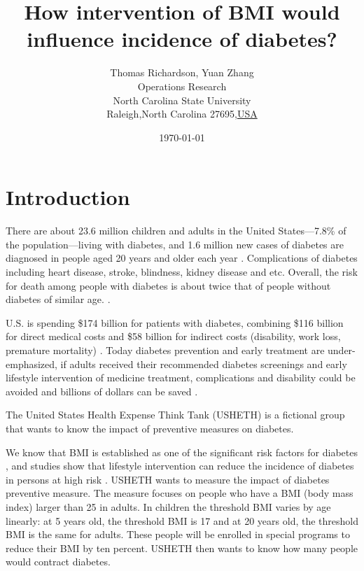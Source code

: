 \documentclass[letterpaper,12pt,onecolumn]{article}
\title{How intervention of BMI would influence incidence of diabetes? }
\author{Thomas Richardson, Yuan Zhang \\
        Operations Research\\
        North Carolina State University\\
        Raleigh,North Carolina 27695,\underline{USA}
}
\date{\today}
\begin{document}
\maketitle
\newpage


\section{Introduction}
There are about 23.6 million children and adults in the United States—7.8\% of the population—living with  diabetes, and 1.6 million new cases of diabetes are diagnosed in people aged 20 years and older each year \cite{Diabetes2007}. Complications of diabetes including heart disease, stroke, blindness, kidney disease and etc. Overall, the risk for death among people with diabetes is about twice that of people without diabetes of similar age. \cite{Diabetes2007}.

U.S. is spending \$174 billion for patients with diabetes, combining \$116 billion for direct medical costs and \$58 billion for indirect costs (disability, work loss, premature mortality) \cite{Diabetes2007}. Today diabetes prevention and early treatment are under-emphasized, if adults received their recommended diabetes screenings and early lifestyle intervention of  medicine treatment, complications and disability could be avoided and billions of dollars can be saved \cite{Chang2007}. 

The United States Health Expense Think Tank (USHETH) is a fictional group that wants to know the impact of preventive measures on diabetes.


We know that BMI is established as one of the  significant risk factors for diabetes \cite{Weinstein2004}, and studies show that lifestyle intervention can reduce the incidence of diabetes in persons at high risk \cite{Knowler2002}. USHETH wants to measure the impact of diabetes preventive measure. The measure focuses on people who have a BMI (body mass index) larger than 25 in adults.  In children the threshold BMI varies by age linearly: at 5 years old, the threshold BMI is 17 and at 20 years old, the threshold BMI is the same for adults.  These people will be enrolled in special programs to reduce their BMI by ten percent. USHETH then wants to know how many people would contract diabetes.
\end{document}
